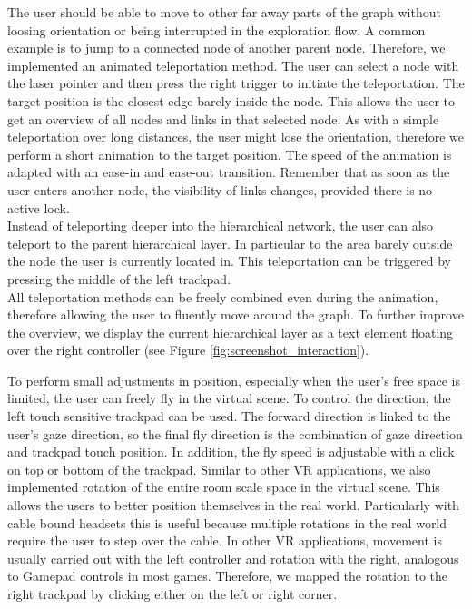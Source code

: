 The user should be able to move to other far away parts of the graph without loosing orientation or being interrupted in the exploration flow. A common example is to jump to a connected node of another parent node. 
Therefore, we implemented an animated teleportation method. The user can select a node with the laser pointer and then press the right trigger to initiate the teleportation. The target position is the closest edge barely inside the node. This allows the user to get an overview of all nodes and links in that selected node.   
As with a simple teleportation over long distances, the user might lose the orientation, therefore we perform a short animation to the target position. The speed of the animation is adapted with an ease-in and ease-out transition.
Remember that as soon as the user enters another node, the visibility of links changes, provided there is no active lock.\\
Instead of teleporting deeper into the hierarchical network, the user can also teleport to the parent hierarchical layer. In particular to the area barely outside the node the user is currently located in. This teleportation can be triggered by pressing the middle of the left trackpad.\\
All teleportation methods can be freely combined even during the animation, therefore allowing the user to fluently move around the graph. 
To further improve the overview, we display the current hierarchical layer as a text element floating over the right controller (see Figure \ref{fig:screenshot_interaction}). 

To perform small adjustments in position, especially when the user's free space is limited, the user can freely fly in the virtual scene. To control the direction, the left touch sensitive trackpad can be used. 
The forward direction is linked to the user's gaze direction, so the final fly direction is the combination of gaze direction and trackpad touch position. 
In addition, the fly speed is adjustable with a click on top or bottom of the trackpad.    
Similar to other VR applications, we also implemented rotation of the entire room scale space in the virtual scene. This allows the users to better position themselves in the real world. 
Particularly with cable bound headsets this is useful because multiple rotations in the real world require the user to step over the cable. In other VR applications, movement is usually carried out with the left controller and rotation with the right, analogous to Gamepad controls in most games. Therefore, we mapped the rotation to the right trackpad by clicking either on the left or right corner.

